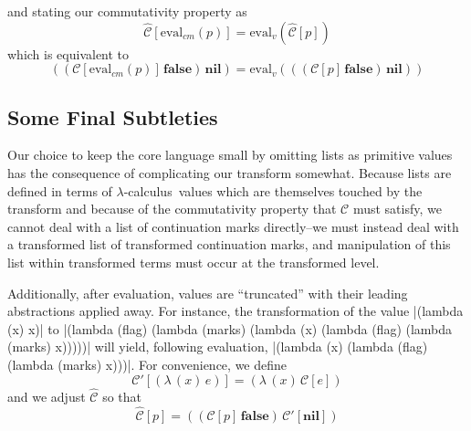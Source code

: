 \documentclass[ms,electronic,twosidetoc,letterpaper,chaptercenter,parttop]{byumsphd}
\newcommand{\lc}{$\lambda$-calculus}
\newcommand{\false}{\mathbf{false}}
\newcommand{\nil}{\mathbf{nil}}
\newcommand{\C}[1]{\mathcal{C}[#1]}
\newcommand{\Cp}[1]{\mathcal{C}'[#1]}
\newcommand{\Ch}[1]{\hat{\mathcal{C}}[#1]}
\newcommand{\evalv}[1]{\mathrm{eval}_v(#1)}
\newcommand{\evalcm}[1]{\mathrm{eval}_{cm}(#1)}
\newcommand{\abs}[2]{(\lambda\,(#1)\,#2)}
\newcommand{\app}[2]{(#1\,#2)}
\begin{document}
and stating our commutativity property as
\begin{equation}
\label{commutativity-property}
\Ch{\evalcm{p}}=\evalv{\Ch{p}}
\end{equation}
which is equivalent to
\begin{equation}
\app{\app{\C{\evalcm{p}}}{\false}}{\nil}=\evalv{\app{\app{\C{p}}{\false}}{\nil}}
\end{equation}

\subsection{Some Final Subtleties}

Our choice to keep the core language small by omitting lists as primitive values has the consequence of complicating our transform somewhat. Because lists are defined in terms of \lc\ values which are themselves touched by the transform and because of the commutativity property that $\mathcal{C}$ must satisfy, we cannot deal with a list of continuation marks directly--we must instead deal with a transformed list of transformed continuation marks, and manipulation of this list within transformed terms must occur at the transformed level.

Additionally, after evaluation, values are ``truncated'' with their leading abstractions applied away. For instance, the transformation of the value \scheme|(lambda (x) x)| to \scheme|(lambda (flag) (lambda (marks) (lambda (x) (lambda (flag) (lambda (marks) x)))))| will yield, following evaluation, \scheme|(lambda (x) (lambda (flag) (lambda (marks) x)))|. For convenience, we define 
\begin{equation}
\Cp{\abs{x}{e}}=\abs{x}{\C{e}}
\end{equation}
and we adjust $\hat{\mathcal{C}}$ so that
\begin{equation}
\Ch{p}=\app{\app{\C{p}}{\false}}{\Cp{\nil}}
\end{equation}


\theoremstyle{definition}
\newtheorem{case}{Case}
\newtheorem{defn}{Definition}

\theoremstyle{plain}
\newtheorem{lemma}{Lemma}
\newtheorem{theorem}{Theorem}

\newenvironment{schemedefn}[1]{\begin{defn}#1}{\end{defn}}
\newenvironment{namedschemedefn}[2]{\begin{defn}\label{#1}$#2$}{\end{defn}}
\end{document}
